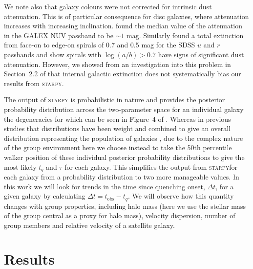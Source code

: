 \documentclass[useAMS,usenatbib]{mn2e}
\def\starpy ~{\textsc{starpy}}
\begin{document}
We note also that galaxy colours were not corrected for intrinsic dust attenuation. This is of particular consequence for disc galaxies, where attenuation increases with increasing inclination. \cite{Buat05} found the median value of the attenuation in the GALEX NUV passband to be $\sim 1$ mag. Similarly \cite{masters10c} found a total extinction from face-on to edge-on spirals of 0.7 and 0.5 mag for the SDSS $u$ and $r$ passbands and show spirals with $\log(a/b) > 0.7$ have signs of significant dust attenuation. However, we showed from an investigation into this problem in Section~2.2 of \citet{smethurst16} that internal galactic extinction does not systematically bias our results from \starpy~. 

The output of \starpy  ~ is probabilistic in nature and provides the posterior probability distribution across the two-parameter space for an individual galaxy the degeneracies for which can be seen in Figure~4 of \citet{smethurst15}.  Whereas in previous studies that distributions have been weight and combined to give an overall distribution representing the population of galaxies \citep[see][]{smethurst15, smethurst16}, due to the complex nature of the group environment here we choose instead to take the 50th percentile walker position of these individual posterior probability distributions to give the most likely $t_{q}$ and $\tau$ for each galaxy. This simplifies the output from \starpy ~for each galaxy from a probability distribution to two more manageable values. In this work we will look for trends in the time since quenching onset, $\Delta t$, for a given galaxy by calculating $\Delta t = t_\mathrm{obs} - t_{q}$. We will observe how this quantity changes with group properties, including halo mass (here we use the stellar mass of the group central as a proxy for halo mass), velocity dispersion, number of group members and relative velocity of a satellite galaxy. 

\section{Results}\label{sec:results}
\end{document}
